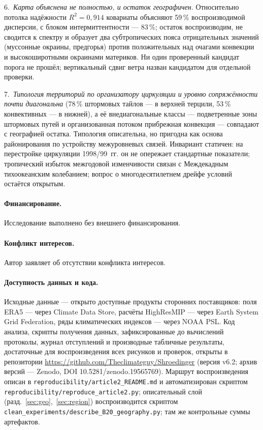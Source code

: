\documentclass[11pt,a4paper]{article}
\begin{document}
6.~\emph{Карта объяснена не полностью, и остаток географичен.} Относительно потолка надёжности $R^2=0{,}914$ ковариаты объясняют 59\,\% воспроизводимой дисперсии, с блоком интермиттентности --- 83\,\%; остаток воспроизводим, не сводится к спектру и образует два субтропических пояса отрицательных значений (муссонные окраины, предгорья) против положительных над очагами конвекции и высокоширотными окраинами материков. Ни один проверенный кандидат порога не прошёл; вертикальный сдвиг ветра назван кандидатом для отдельной проверки.

7.~\emph{Типология территорий по организатору циркуляции и уровню сопряжённости почти диагональна} (78\,\% штормовых тайлов --- в верхней терцили, 53\,\% конвективных --- в нижней), а её внедиагональные классы --- подветренные зоны штормовых путей и организованная потоком прибрежная конвекция --- совпадают с географией остатка. Типология описательна, но пригодна как основа районирования по устройству межуровневых связей. Инвариант статичен: на перестройке циркуляции 1998/99~гг. он не опережает стандартные показатели; тропический избыток межгодовой изменчивости связан с Междекадным тихоокеанским колебанием; вопрос о многодесятилетнем дрейфе условий остаётся открытым.

\paragraph{Финансирование.} Исследование выполнено без внешнего финансирования.

\paragraph{Конфликт интересов.} Автор заявляет об отсутствии конфликта интересов.

\paragraph{Доступность данных и кода.} Исходные данные --- открыто доступные продукты сторонних поставщиков: поля ERA5 --- через Climate Data Store, расчёты HighResMIP --- через Earth System Grid Federation, ряды климатических индексов --- через NOAA PSL. Код анализа, скрипты получения данных, зафиксированные до вычислений протоколы, журнал отступлений и производные табличные результаты, достаточные для воспроизведения всех рисунков и проверок, открыты в репозитории \url{https://github.com/Theclimateguy/Shroedinger} (версия v6.2; архив версий --- Zenodo, DOI 10.5281/zenodo.19565769). Маршрут воспроизведения описан в \texttt{reproducibility/article2\_README.md} и автоматизирован скриптом \texttt{reproducibility/reproduce\_article2.py}; описательный слой (разд.~\ref{sec:geo},~\ref{sec:region}) воспроизводится скриптом \texttt{clean\_experiments/describe\_B20\_geography.py}; там же контрольные суммы артефактов.

\printbibliography[title={Список литературы}]
\end{document}
